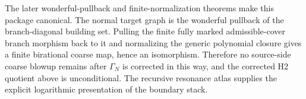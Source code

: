 \documentclass[11pt]{article}
\begin{document}
The later wonderful-pullback and finite-normalization theorems make this
package canonical.  The normal target graph is the wonderful pullback of the
branch-diagonal building set.  Pulling the finite fully marked
admissible-cover branch morphism back to it and normalizing the generic
polynomial closure gives a finite birational coarse map, hence an
isomorphism.  Therefore no source-side coarse blowup remains after
$\Gamma_N$ is corrected in this way, and the corrected H2 quotient above is
unconditional.  The recursive resonance atlas supplies the explicit
logarithmic presentation of the boundary stack.
\end{document}
